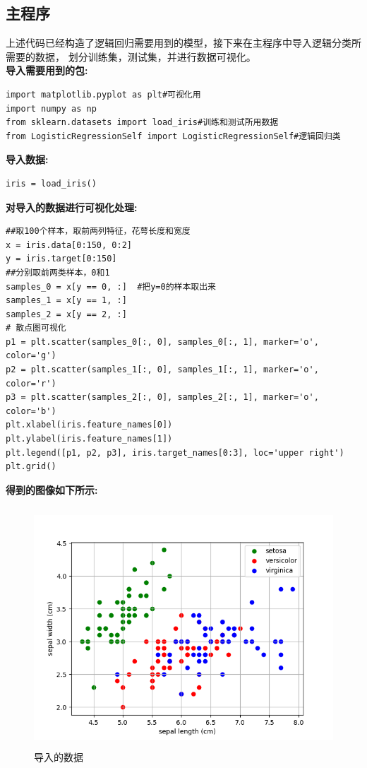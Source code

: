 \documentclass[UTF8]{article}
\begin{document}
\subsection{主程序}
上述代码已经构造了逻辑回归需要用到的模型，接下来在主程序中导入逻辑分类所需要的数据，
划分训练集，测试集，并进行数据可视化。\\
\textbf{导入需要用到的包:}
\begin{lstlisting}[style=myPython]
import matplotlib.pyplot as plt#可视化用
import numpy as np
from sklearn.datasets import load_iris#训练和测试所用数据
from LogisticRegressionSelf import LogisticRegressionSelf#逻辑回归类
\end{lstlisting}
\textbf{导入数据:}
\begin{lstlisting}[style=myPython]
iris = load_iris()
\end{lstlisting}
\textbf{对导入的数据进行可视化处理:}
\begin{lstlisting}[style=myPython]
##取100个样本，取前两列特征，花萼长度和宽度
x = iris.data[0:150, 0:2]
y = iris.target[0:150]
##分别取前两类样本，0和1
samples_0 = x[y == 0, :]  #把y=0的样本取出来
samples_1 = x[y == 1, :]
samples_2 = x[y == 2, :]
# 散点图可视化
p1 = plt.scatter(samples_0[:, 0], samples_0[:, 1], marker='o', color='g')
p2 = plt.scatter(samples_1[:, 0], samples_1[:, 1], marker='o', color='r')
p3 = plt.scatter(samples_2[:, 0], samples_2[:, 1], marker='o', color='b')
plt.xlabel(iris.feature_names[0])
plt.ylabel(iris.feature_names[1])
plt.legend([p1, p2, p3], iris.target_names[0:3], loc='upper right')
plt.grid()
\end{lstlisting}
\textbf{得到的图像如下所示:}
\begin{figure}[htbp]
	\centering
	\includegraphics[width=12.0cm,height=9.0cm]{picture/鸢尾花分类_原始数据.png}
	\caption{导入的数据}
\end{figure}
\end{document}
